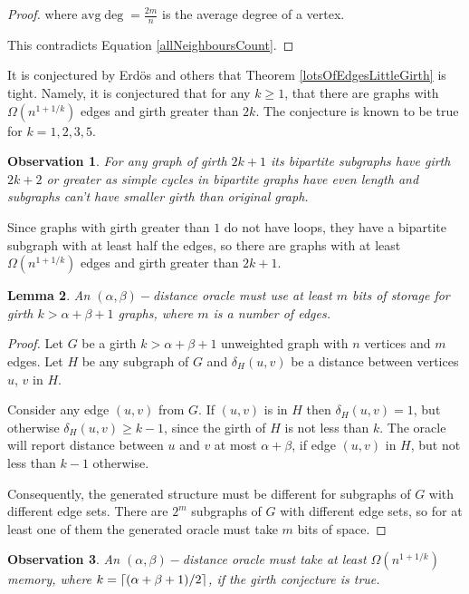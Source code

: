 \documentclass[shortabstract, lic, english]{iithesis}
\theoremstyle{definition} \newtheorem{definition}{Definition}[chapter]
\theoremstyle{plain} \newtheorem{remark}[definition]{Observation}
\theoremstyle{plain} \newtheorem{theorem}[definition]{Theorem}
\theoremstyle{plain} \newtheorem{lemma}[definition]{Lemma}
\theoremstyle{plain} \newtheorem{conjecture}[definition]{Conjecture}
\DeclarePairedDelimiter{\ceil}{\lceil}{\rceil}
\begin{document}
\begin{proof}
    where $\text{avg}\deg = \frac{2m}{n}$ is the average degree of a vertex.

    This contradicts Equation \ref{allNeighboursCount}.
\end{proof}

It is conjectured by Erd{\"o}s \cite{erdos1963} and others that Theorem \ref{lotsOfEdgesLittleGirth} is tight.
Namely, it is conjectured that for any $k\geq1$, that there are graphs with
$\Omega(n^{1 + 1/k})$ edges and girth greater than $2k$. The conjecture is known to be true for $k=1,2,3,5$.

\begin{remark}
    For any graph of girth $2k+1$ its bipartite subgraphs have girth $2k+2$ or greater
    as simple cycles in bipartite graphs have even length and subgraphs can't have smaller girth than original graph.
\end{remark}

Since graphs with girth greater than $1$ do not have loops, they have a bipartite subgraph with at least half the edges, so
there are graphs with at least $\Omega(n^{1 + 1/k})$ edges and girth greater than $2k+1$.

\begin{lemma}
    An $(\alpha, \beta)-$distance oracle 
    must use at least $m$ bits of storage for girth $k > \alpha + \beta + 1$ graphs, where $m$ is a number of edges.
\end{lemma}
\begin{proof}
    Let $G$ be a girth $k > \alpha + \beta + 1$ unweighted graph with $n$ vertices and $m$ edges.
    Let $H$ be any subgraph of $G$ and $\delta_H(u,v)$ be a distance between vertices $u$, $v$ in $H$.
    
    Consider any edge $(u, v)$ from $G$.
    If $(u, v)$ is in $H$ then $\delta_H(u,v) = 1$, but otherwise $\delta_H(u,v) \geq k - 1$, since the girth of $H$ is not less than $k$.
    The oracle will report distance between $u$ and $v$ at most $\alpha + \beta$, if edge $(u,v)$ in $H$,
    but not less than $k-1$ otherwise. 
    
    Consequently, the generated structure must be different for subgraphs of $G$ with different edge sets.
    There are $2^m$ subgraphs of $G$ with different edge sets, so for at least one of them the generated oracle must take $m$ bits of space.
\end{proof}

\begin{remark}
    An $(\alpha, \beta)-$distance oracle must take at least $\Omega(n^{1+1/k})$ memory, where
    $k=\ceil{(\alpha + \beta + 1)/2}$, if the girth conjecture is true.
\end{remark}
\end{document}
